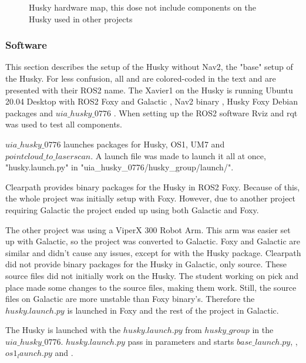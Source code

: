 \begin{figure}[H]
\begin{minipage}[b]{0.59\textwidth}
    \caption{Husky hardware map, this dose not include components on the Husky used in other projects}
    \label{fig:Husky_HW}
  \end{minipage}
\end{figure}
\subsubsection{Software}
This section describes the setup of the Husky without Nav2, the "base" setup of the Husky. For less confusion, all  and  are colored-coded in the text and are presented with their ROS2 name.
The Xavier1 on the Husky is running Ubuntu 20.04 Desktop \cite{ubuntu20_04} with ROS2 Foxy \cite{rosfoxyinstall} and Galactic \cite{rosgalacticinstall}, Nav2 binary \cite{rosnavinstall}, Husky Foxy Debian packages \cite{huskyinstall} and $uia\_husky\_0776$ \cite{uiahusky}. When setting up the ROS2 software Rviz and rqt was used to test all components. \newline
    
$uia\_husky\_0776$ launches packages for Husky, OS1, UM7 and $pointcloud\_to\_laserscan$. A launch file was made to launch it all at once, "husky.launch.py" in "uia\_husky\_0776/husky\_group/launch/".

Clearpath provides binary packages for the Husky in ROS2 Foxy. Because of this, the whole project was initially setup with Foxy. However, due to another project requiring Galactic the project ended up using both Galactic and Foxy.

The other project was using a ViperX 300 Robot Arm. This arm was easier set up with Galactic, so the project was converted to Galactic. Foxy and Galactic are similar and didn't cause any issues, except for with the Husky package. Clearpath did not provide binary packages for the Husky in Galactic, only source. These source files did not initially work on the Husky. The student working on pick and place made some changes to the source files, making them work. Still, the source files on Galactic are more unstable than Foxy binary's. Therefore the $husky.launch.py$ is launched in Foxy and the rest of the project in Galactic. 

The Husky is launched with the $husky.launch.py$ from $husky\_group$ in the $uia\_husky\_0776$. $husky.launch.py$ pass in parameters and starts $base\_launch.py$, , $os1_launch.py$ and . 

